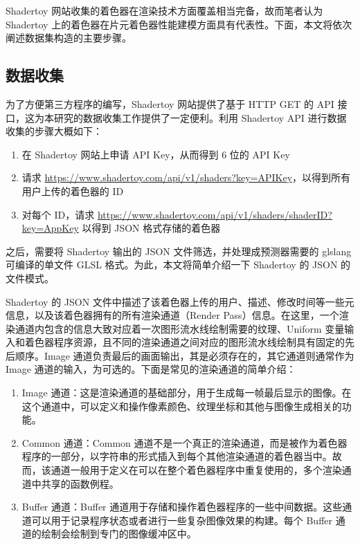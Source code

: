 Shadertoy 网站收集的着色器在渲染技术方面覆盖相当完备，故而笔者认为 Shadertoy 上的着色器在片元着色器性能建模方面具有代表性。下面，本文将依次阐述数据集构造的主要步骤。

\subsection{数据收集}

为了方便第三方程序的编写，Shadertoy 网站提供了基于 HTTP GET 的 API 接口，这为本研究的数据收集工作提供了一定便利。利用 Shadertoy API 进行数据收集的步骤大概如下：

\begin{enumerate}
    \item 在 Shadertoy 网站上申请 API Key，从而得到 6 位的 API Key
    \item 请求 \url{https://www.shadertoy.com/api/v1/shaders?key=APIKey}，以得到所有用户上传的着色器的 ID
    \item 对每个 ID，请求 \url{https://www.shadertoy.com/api/v1/shaders/shaderID?key=AppKey} 以得到 JSON 格式存储的着色器
\end{enumerate}

之后，需要将 Shadertoy 输出的 JSON 文件筛选，并处理成预测器需要的 glslang 可编译的单文件 GLSL 格式。为此，本文将简单介绍一下 Shadertoy 的 JSON 的文件模式。

Shadertoy 的 JSON 文件中描述了该着色器上传的用户、描述、修改时间等一些元信息，以及该着色器拥有的所有渲染通道（Render Pass）信息。在这里，一个渲染通道内包含的信息大致对应着一次图形流水线绘制需要的纹理、Uniform 变量输入和着色器程序资源，且不同的渲染通道之间对应的图形流水线绘制具有固定的先后顺序。Image 通道负责最后的画面输出，其是必须存在的，其它通道则通常作为 Image 通道的输入，为可选的。下面是常见的渲染通道的简单介绍：

\begin{enumerate}
    \item Image 通道：这是渲染通道的基础部分，用于生成每一帧最后显示的图像。在这个通道中，可以定义和操作像素颜色、纹理坐标和其他与图像生成相关的功能。
    \item Common 通道：Common 通道不是一个真正的渲染通道，而是被作为着色器程序的一部分，以字符串的形式插入到每个其他渲染通道的着色器当中。故而，该通道一般用于定义在可以在整个着色器程序中重复使用的，多个渲染通道中共享的函数例程。
    \item Buffer 通道：Buffer 通道用于存储和操作着色器程序的一些中间数据。这些通道可以用于记录程序状态或者进行一些复杂图像效果的构建。每个 Buffer 通道的绘制会绘制到专门的图像缓冲区中。
\end{enumerate}

